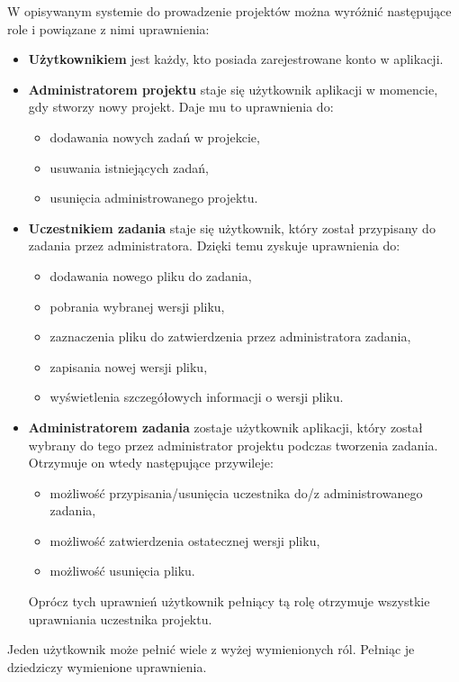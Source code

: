 W opisywanym systemie do prowadzenie projektów można wyróżnić następujące role i powiązane z nimi uprawnienia:
\begin{itemize}
    \item \textbf{Użytkownikiem} jest każdy, kto posiada zarejestrowane konto w aplikacji.
    \item \textbf{Administratorem projektu} staje się użytkownik aplikacji w momencie, gdy stworzy nowy projekt.
    Daje mu to uprawnienia do:
    \begin{itemize}
        \item dodawania nowych zadań w projekcie,
        \item usuwania istniejących zadań,
        \item usunięcia administrowanego projektu.
    \end{itemize}
    \item \textbf{Uczestnikiem zadania} staje się użytkownik, który został przypisany do zadania przez administratora.
    Dzięki temu zyskuje uprawnienia do:
    \begin{itemize}
        \item dodawania nowego pliku do zadania,
        \item pobrania wybranej wersji pliku,
        \item zaznaczenia pliku do zatwierdzenia przez administratora zadania,
        \item zapisania nowej wersji pliku,
        \item wyświetlenia szczegółowych informacji o wersji pliku.
    \end{itemize}
    \item \textbf{Administratorem zadania} zostaje użytkownik aplikacji, który został wybrany do tego przez administrator projektu podczas tworzenia zadania.
    Otrzymuje on wtedy następujące przywileje:
    \begin{itemize}
        \item możliwość przypisania/usunięcia uczestnika do/z administrowanego zadania,
        \item możliwość zatwierdzenia ostatecznej wersji pliku,
        \item możliwość usunięcia pliku.
    \end{itemize}
    Oprócz tych uprawnień użytkownik pełniący tą rolę otrzymuje wszystkie uprawniania uczestnika projektu.
\end{itemize}

Jeden użytkownik może pełnić wiele z wyżej wymienionych ról.
Pełniąc je dziedziczy wymienione uprawnienia. 


